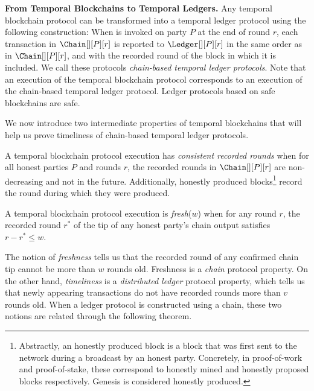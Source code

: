 \noindent
\textbf{From Temporal Blockchains to Temporal Ledgers.}
Any temporal blockchain protocol can be transformed into a
temporal ledger protocol using the following construction:
When \rread is invoked on party $P$ at the end of round $r$, each transaction in
$\Chain[][P][r]$ is reported to $\Ledger[][P][r]$ in the same order as in $\Chain[][P][r]$, and with
the recorded round of the block in which it is included.
We call these protocols \emph{chain-based temporal ledger protocols}.
Note that an execution of the temporal blockchain protocol corresponds to an execution of the chain-based temporal ledger protocol.
Ledger protocols based on safe blockchains are safe.

We now introduce two intermediate properties of temporal blockchains
that will help us prove timeliness of
chain-based temporal ledger protocols.

\begin{definition}
  A temporal blockchain protocol execution has \emph{consistent recorded rounds}
  when for all honest parties $P$ and rounds $r$,
  the recorded rounds in $\Chain[][P][r]$ are non-decreasing and not
  in the future.
  Additionally, honestly produced blocks\footnote{
    Abstractly, an honestly produced block is a block that was first
    sent to the network during a broadcast by an honest party. Concretely, in proof-of-work
    and proof-of-stake, these correspond to honestly mined and honestly
    proposed blocks respectively. Genesis is considered honestly produced.
  } record the round during which
  they were produced.
\end{definition}

\begin{definition}[Freshness] \label{def:tip-freshness}
  A temporal blockchain protocol execution is \emph{fresh}($w$) when for
  any round $r$, the recorded round
  $r^*$ of the tip of any honest party's chain output
  satisfies $r - r^* \leq w$.
\end{definition}

The notion of \emph{freshness} tells us that the recorded round
of any confirmed chain tip cannot be more than $w$ rounds old.
Freshness is a \emph{chain} protocol property.
On the other hand, \emph{timeliness} is a \emph{distributed ledger} protocol property,
which tells us that newly appearing transactions
do not have recorded rounds more than $v$ rounds old.
When a ledger protocol is constructed using a chain,
these two notions are related through the following theorem.

